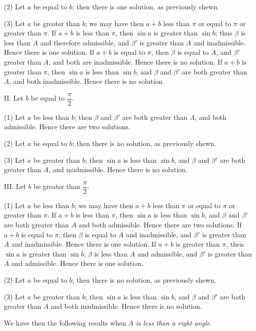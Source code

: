 \documentclass{book}[2004/02/16]
\begin{document}
\begin{mainmatter}
\begin{spacing}{1.3}
(2) Let $a$ be equal to $b$; then there is one solution, as previously
shewn.

(3) Let $a$ be greater than $b$; we may have then $a + b$ less than
$\pi$ or equal to $\pi$ or greater than $\pi$. If $a + b$ is less than $\pi$, then
$\sin a$ is greater than $\sin b$; thus $\beta$ is less than $A$ and therefore
admissible, and $\beta'$ is greater than $A$ and inadmissible. Hence there
is one solution. If $a + b$ is equal to $\pi$, then $\beta$ is equal to $A$, and
$\beta'$ greater than $A$, and both are inadmissible. Hence there is no
solution. If $a+b$ is greater than $\pi$, then $\sin a$ is less than $\sin b$,
and $\beta$ and $\beta'$ are both greater than $A$, and both inadmissible.
Hence there is no solution.\medskip

II\@. Let $b$ be equal to $\dfrac{\pi}{2}$.

(1) Let $a$ be less than $b$; then $\beta$ and $\beta'$ are both greater than
$A$, and both admissible. Hence there are two solutions.

(2) Let $a$ be equal to $b$; then there is no solution, as previously
shewn.

(3) Let $a$ be greater than $b$; then $\sin a$ is less than $\sin b$, and
$\beta$ and $\beta'$ are both greater than $A$, and inadmissible. Hence there
is no solution.\medskip

III\@. Let $b$ be greater than $\dfrac{\pi}{2}$.

(1) Let $a$ be less than $b$; we may have then $a + b$ less than
$\pi$ or equal to $\pi$ or greater than $\pi$. If $a + b$ is less than $\pi$, then
$\sin a$ is less than $\sin b$, and $\beta$ and $\beta'$ are both greater than $A$ and
both admissible. Hence there are two solutions. If $a + b$ is equal
to $\pi$, then $\beta$ is equal to $A$ and inadmissible, and $\beta'$ is greater
than $A$ and inadmissible. Hence there is one solution. If $a + b$
is greater than $\pi$, then $\sin a$ is greater than $\sin b$; $\beta$ is less
than $A$ and admissible, and $\beta'$ is greater than $A$ and admissible.
Hence there is one solution.

(2) Let $a$ be equal to $b$; then there is no solution, as previously
shewn.

(3) Let $a$ be greater than $b$; then $\sin a$ is less than $\sin b$,
and $\beta$ and $\beta'$ are both greater than $A$ and both inadmissible.
Hence there is no solution.

We have then the following results when $A$ \textit{is less than a
right angle}.


\end{spacing}
\end{mainmatter}
\end{document}

